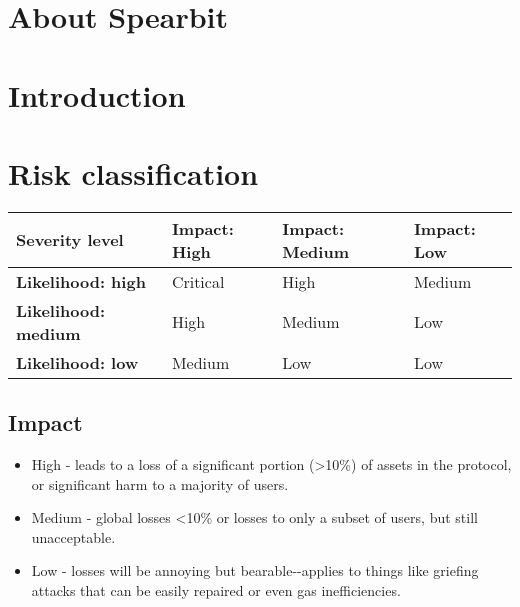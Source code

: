 \hypertarget{spearbit}{%
\section{About Spearbit}\label{spearbit}}



\hypertarget{introduction}{%
\section{Introduction}\label{introduction}}



\hypertarget{risk-classification}{%
\section{Risk classification}\label{risk-classification}}


\begin{longtable}{@{}|l|l|l|l|@{}}
  \hline \textbf{Severity level} & \textbf{Impact: High} & \textbf{Impact: Medium} & \textbf{Impact: Low} \\
  \hline \textbf{Likelihood: high} & Critical & High & Medium \\
  \hline \textbf{Likelihood: medium} & High & Medium & Low \\
  \hline \textbf{Likelihood: low} & Medium & Low & Low \\
  \hline
\end{longtable}


\hypertarget{impact}{%
\subsection{Impact}\label{impact}}

\begin{itemize}
\tightlist
\item
  High - leads to a loss of a significant portion (\textgreater10\%) of
  assets in the protocol, or significant harm to a majority of users.
\item
  Medium - global losses \textless10\% or losses to only a subset of
  users, but still unacceptable.
\item
  Low - losses will be annoying but bearable-\/-applies to things like
  griefing attacks that can be easily repaired or even gas
  inefficiencies.
\end{itemize}

